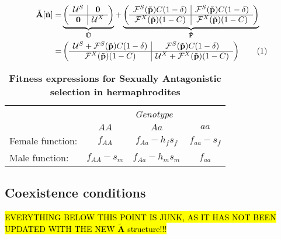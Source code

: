 \documentclass[11pt]{article}
\newcommand\numberthis{\addtocounter{equation}{1}\tag{\theequation}}
\def\mbf#1{\mathbf{#1}}
\def\mcal#1{\mathcal{#1}}
\begin{document}
\begin{align*}
	\tilde{\mbf{A}}[\tilde{\mbf{n}}] = 
			&\underbrace{\left(
			\begin{array}{c|c}
				\mcal{U}^S & \mbf{0} \\ \hline
				\mbf{0} & \mcal{U}^X \\
			\end{array} \right)}_{\tilde{\mbf{U}}} + 
			\underbrace{\left(
			\begin{array}{c|c}
				\mcal{F}^S(\tilde{\mbf{p}}) C(1 - \delta) & \mcal{F}^S(\tilde{\mbf{p}}) C(1 - \delta) \\ \hline
				\mcal{F}^X(\tilde{\mbf{p}}) (1 - C) & \mcal{F}^X(\tilde{\mbf{p}}) (1 - C)\\
			\end{array} \right)}_{\tilde{\mbf{F}}} \\
			= & \left(\begin{array}{c|c}
				\mcal{U}^S + \mcal{F}^S(\tilde{\mbf{p}}) C(1 - \delta) & \mcal{F}^S(\tilde{\mbf{p}}) C(1 - \delta) \\ \hline
				\mcal{F}^X(\tilde{\mbf{p}})(1 - C) & \mcal{U}^X + \mcal{F}^X(\tilde{\mbf{p}}) (1 - C)
			\end{array} \right) \numberthis
\end{align*}




\begin{table}[htbp]
 \centering
 \caption{\bf Fitness expressions for Sexually Antagonistic selection in hermaphrodites}
\begin{tabular}{lccc}
 \toprule
					&  \multicolumn{3}{c}{{\textit{Genotype}}} \\ 
\cline{2-4}
					& $AA$			& $Aa$ 					& $aa$ 		\\ \hline
Female function:	& $f_{AA}$		& $f_{Aa} - h_f s_f$	& $f_{aa} - s_f$ \\	
Male function:		& $f_{AA} - s_m$& $f_{Aa} - h_m s_m$	& $f_{aa}$ 		\\	
\hline
\end{tabular}
\end{table}



\newpage
\subsection*{Coexistence conditions}
\setcounter{equation}{0}
\hl{EVERYTHING BELOW THIS POINT IS JUNK, AS IT HAS NOT BEEN UPDATED WITH THE NEW $\tilde{\mbf{A}}$ structure!!!}
\end{document}
